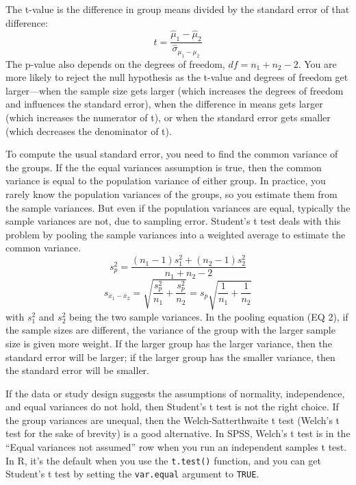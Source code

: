 \documentclass[man, noextraspace, apacite, floatsintext]{apa6}
\begin{document}
The t-value is the 
difference in group means divided by the standard error of that 
difference:   
    \begin{equation}
    t = \frac{\hat{\mu}_1-\hat{\mu}_2}{\hat{\sigma}_{\mu_1-\mu_2}}
    \end{equation}
The p-value also depends on the degrees of 
freedom, $df=n_1+n_2-2$. You are more likely to reject the null 
hypothesis
as the t-value and 
degrees of freedom get larger---when 
the sample size gets larger (which increases the degrees of freedom and influences the standard error), when the 
difference in means gets larger (which increases the numerator of t), or 
when the standard error gets smaller (which decreases the denominator of t). 
    
    To compute the usual standard error, you need to find the 
common variance of the groups. If the the equal variances assumption is true, then the common variance is
equal to the population variance of either group.
In practice, you rarely know the population variances of the groups, so you estimate them from the sample variances. 
But even if the population variances are equal, typically the sample 
variances are not, due to sampling error. Student's t test deals with this
problem by pooling the sample variances into a weighted 
average to estimate the common variance. 
    \begin{equation}
    s_p^2 = \frac{(n_1 - 1)s_1^2 + (n_2 - 1)s_2^2}{n_1 + n_2 - 2}
    \end{equation}
    \begin{equation}
    s_{\overline{x}_1-\overline{x}_2} = \sqrt{\frac{s_p^2}{n_1}  + \frac{s_p^2}{n_2}} = s_p\sqrt{\frac{1}{n_1}  + \frac{1}{n_2}}
    \end{equation}
    with $s_1^2$ and $s_2^2$ being the two sample variances.
In the pooling equation (EQ 2), if the sample sizes are different, the variance of the group 
with the larger sample size is given more weight. If the larger group has the larger 
variance, then the standard error will be larger; if the larger group has the smaller variance, then the standard error will be smaller.

    If the data or study design suggests the assumptions of 
normality, independence, and equal variances do not hold, then Student's t test 
is not the right choice. If the group 
variances are unequal, then the Welch-Satterthwaite t test (Welch's t test for the sake of brevity) is a good alternative.  In SPSS, Welch's t test is in the ``Equal 
variances not assumed'' row when you run an independent samples t 
test. In R, it's the default when you use the
\texttt{t.test()} function, and you can get Student's t test by setting 
the \texttt{var.equal} argument to \texttt{TRUE}.
    
\end{document}
